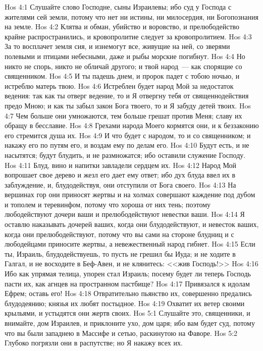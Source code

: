 \vs Hos 4:1 Слушайте слово Господне, сыны Израилевы; ибо суд у Господа с жителями сей земли, потому что нет ни истины, ни милосердия, ни Богопознания на земле.
\vs Hos 4:2 Клятва и обман, убийство и воровство, и прелюбодейство крайне распространились, и кровопролитие следует за кровопролитием.
\vs Hos 4:3 За то восплачет земля сия, и изнемогут все, живущие на ней, со зверями полевыми и птицами небесными, даже и рыбы морские погибнут.
\vs Hos 4:4 Но никто не спорь, никто не обличай другого; и твой народ~--- как спорящие со священником.
\vs Hos 4:5 И ты падешь днем, и пророк падет с тобою ночью, и истреблю матерь твою.
\vs Hos 4:6 Истреблен будет народ Мой за недостаток ведения: так как ты отверг ведение, то и Я отвергну тебя от священнодействия предо Мною; и как ты забыл закон Бога твоего, то и Я забуду детей твоих.
\vs Hos 4:7 Чем больше они умножаются, тем больше грешат против Меня; славу их обращу в бесславие.
\vs Hos 4:8 Грехами народа Моего кормятся они, и к беззаконию его стремится душа их.
\vs Hos 4:9 И что будет с народом, то и со священником; и накажу его по путям его, и воздам ему по делам его.
\vs Hos 4:10 Будут есть, и не насытятся; будут блудить, и не размножатся; ибо оставили служение Господу.
\vs Hos 4:11 Блуд, вино и напитки завладели сердцем их.
\vs Hos 4:12 Народ Мой вопрошает свое дерево и жезл его дает ему ответ; ибо дух блуда ввел их в заблуждение, и, блудодействуя, они отступили от Бога своего.
\vs Hos 4:13 На вершинах гор они приносят жертвы и на холмах совершают каждение под дубом и тополем и теревинфом, потому что хороша от них тень; поэтому любодействуют дочери ваши и прелюбодействуют невестки ваши.
\vs Hos 4:14 Я оставлю наказывать дочерей ваших, когда они блудодействуют, и невесток ваших, когда они прелюбодействуют, потому что вы сами на стороне блудниц и с любодейцами приносите жертвы, а невежественный народ гибнет.
\vs Hos 4:15 Если ты, Израиль, блудодействуешь, то пусть не грешил бы Иуда; и не ходите в Галгал, и не восходите в Беф-Авен, и не клянитесь: <<жив Господь!>>
\vs Hos 4:16 Ибо как упрямая телица, упорен стал Израиль; посему будет ли теперь Господь пасти их, как агнцев на пространном пастбище?
\vs Hos 4:17 Привязался к идолам Ефрем; оставь его!
\vs Hos 4:18 Отвратительно пьянство их, совершенно предались блудодеянию; князья их любят постыдное.
\vs Hos 4:19 Охватит их ветер своими крыльями, и устыдятся они жертв своих.
\vs Hos 5:1 Слушайте это, священники, и внимайте, дом Израилев, и приклоните ухо, дом царя; ибо вам будет суд, потому что вы были западнею в Массифе и сетью, раскинутою на Фаворе.
\vs Hos 5:2 Глубоко погрязли они в распутстве; но Я накажу всех их.
